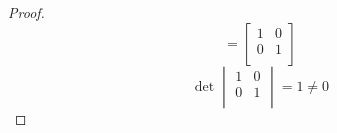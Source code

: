 \documentclass[12pt]{article}
\begin{document}
\begin{enumerate}
\begin{enumerate}
\begin{proof}
\begin{equation*}
                                            =
                                            \begin{bmatrix}
                                                    {1} & {0} \\
                                                    {0} & {1} \\
                                            \end{bmatrix}
                                    \end{equation*}
                                    \begin{equation*}
                                            \det
                                            \begin{vmatrix}
                                                    {1} & {0} \\
                                                    {0} & {1} \\
                                            \end{vmatrix}
                                            = 1 \neq 0
                                    \end{equation*}
                            \end{proof}

\end{enumerate}
\end{enumerate}
\end{document}

